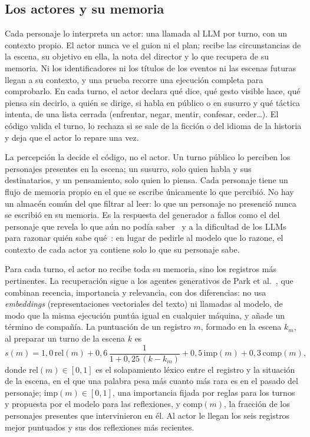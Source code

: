 \subsection{Los actores y su memoria}\label{sec:memoria}

Cada personaje lo interpreta un actor: una llamada al LLM por turno, con un contexto propio. El
actor nunca ve el guion ni el plan; recibe las circunstancias de la escena, su objetivo en ella, la
nota del director y lo que recupera de su memoria. Ni los identificadores ni los títulos de los
eventos ni las escenas futuras llegan a su contexto, y una prueba recorre una ejecución completa
para comprobarlo. En cada turno, el actor declara qué dice, qué gesto visible hace, qué piensa sin
decirlo, a quién se dirige, si habla en público o en susurro y qué táctica intenta, de una lista
cerrada (enfrentar, negar, mentir, confesar, ceder…). El código valida el turno, lo rechaza si se
sale de la ficción o del idioma de la historia y deja que el actor lo repare una vez.

La percepción la decide el código, no el actor. Un turno público lo perciben los personajes
presentes en la escena; un susurro, solo quien habla y sus destinatarios, y un pensamiento, solo
quien lo piensa. Cada personaje tiene un flujo de memoria propio en el que se escribe únicamente lo
que percibió. No hay un almacén común del que filtrar al leer: lo que un personaje no presenció
nunca se escribió en su memoria. Es la respuesta del generador a fallos como el del personaje que
revela lo que aún no podía saber~\cite{ahn2024} y a la dificultad de los LLMs para razonar quién
sabe qué~\cite{kim2023}: en lugar de pedirle al modelo que lo razone, el contexto de cada actor ya
contiene solo lo que su personaje sabe.

Para cada turno, el actor no recibe toda su memoria, sino los registros más pertinentes. La
recuperación sigue a los agentes generativos de Park et al.~\cite{park2023}, que combinan recencia,
importancia y relevancia, con dos diferencias: no usa \textit{embeddings} (representaciones
vectoriales del texto) ni llamadas al modelo, de modo que la misma ejecución puntúa igual en
cualquier máquina, y añade un término de compañía. La puntuación de un registro $m$, formado en la
escena $k_m$, al preparar un turno de la escena $k$ es
\begin{equation}
  s(m) = 1{,}0\,\mathrm{rel}(m) + 0{,}6\,\frac{1}{1 + 0{,}25\,(k - k_m)} + 0{,}5\,\mathrm{imp}(m)
  + 0{,}3\,\mathrm{comp}(m),
\end{equation}
donde $\mathrm{rel}(m) \in [0, 1]$ es el solapamiento léxico entre el registro y la situación de la
escena, en el que una palabra pesa más cuanto más rara es en el pasado del personaje;
$\mathrm{imp}(m) \in [0, 1]$, una importancia fijada por reglas para los turnos y propuesta por el
modelo para las reflexiones, y $\mathrm{comp}(m)$, la fracción de los personajes presentes que
intervinieron en él. Al actor le llegan los seis registros mejor puntuados y sus dos reflexiones más
recientes.

